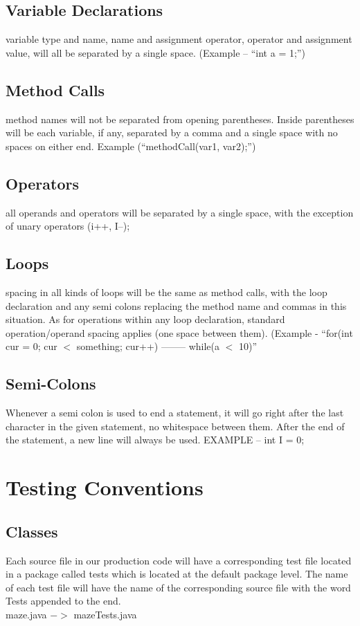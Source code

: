 \documentclass{article}
\begin{document}
\subsection{Variable Declarations}
variable type and name, name and assignment operator, operator and assignment value, will all be separated by a single space. (Example – \enquote{int a = 1;})
\subsection{Method Calls}
method names will not be separated from opening parentheses. Inside parentheses will be each variable, if any, separated by a comma and a single space with no spaces on either end. Example (\enquote{methodCall(var1, var2);})
\subsection{Operators}
all operands and operators will be separated by a single space, with the exception of unary operators (i++, I--);
\subsection{Loops}
spacing in all kinds of loops will be the same as method calls, with the loop declaration and any semi colons replacing the method name and commas in this situation. As for operations within any loop declaration, standard operation/operand spacing applies (one space between them). 
\newline (Example - \enquote{for(int cur = 0; cur $<$ something; cur++) -------- while(a $<$ 10)}

\subsection{Semi-Colons}
Whenever a semi colon is used to end a statement, it will go right after the last character in the given statement, no whitespace between them. After the end of the statement, a new line will always be used. \newline  EXAMPLE – int I = 0;

\section{Testing Conventions}
\subsection{Classes}
Each source file in our production code will have a corresponding test file located in a package called tests which is located at the default package level. The name of each test file will have the name of the corresponding source file with the word Tests appended to the end. \\
maze.java $->$ mazeTests.java
\end{document}

